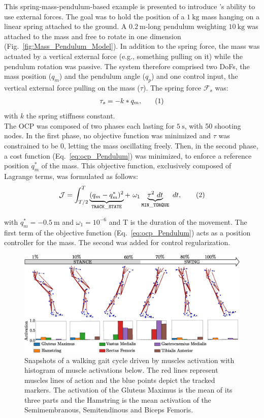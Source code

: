 This spring-mass-pendulum-based example is presented to introduce \bioptim 's ability to use external forces.
The goal was to hold the position of a $\SI{1}{\kilo\gram}$ mass hanging on a linear spring attached to the ground.
A $\SI{0.2}{\meter}$-long pendulum weighting $\SI{10}{\kilo\gram}$ was attached to the mass and free to rotate in one dimension (Fig.~\ref{fig:Mass_Pendulum_Model}).
In addition to the spring force, the mass was actuated by a vertical external force (e.g., something pulling on it) while the pendulum rotation was passive.
The system therefore comprised two DoFs, the mass position ($q_m$) and the pendulum angle ($q_p$) and one control input, the vertical external force pulling on the mass ($\tau$). 
The spring force $\mathcal{F}_s$ was:
\[
\begin{aligned}
\tau_s = -k*q_m,
\end{aligned}
\addtag
\label{eq:f_ext}
\]
with $k$ the spring stiffness constant.\\
The OCP was composed of two phases each lasting for $\SI{5}{\second}$, with 50 shooting nodes.
In the first phase, no objective function was minimized and $\tau$ was constrained to be $0$, letting the mass oscillating freely. 
Then, in the second phase, a cost function (Eq.~\ref{eq:ocp_Pendulum}) was minimized, to enforce a reference position $q_m^*$ of the mass.
This objective function, exclusively composed of Lagrange terms, was formulated as follows:
\[
\mathcal{J} = \int_{T/2}^T \underbrace{ (q_m - q_m^*)^2}_{\mathtt{TRACK\_STATE}}  +~\omega_1 \underbrace{\tau^2~dt}_{\mathtt{MIN\_ TORQUE}}~dt,
\addtag
\label{eq:ocp_Pendulum}
\]

\noindent with $q_m^* = \SI{-0.5}{\meter}$ and $\omega_1 = 10^{-6}$ and T is the duration of the movement.
The first term of the objective function (Eq.~\ref{eq:ocp_Pendulum}) acts as a position controller for the mass.
The second was added for control regularization.

\begin{figure}[t!]
\centering
\includegraphics[width=\textwidth]{figures/multiphase_walking_cycle.eps}
\caption{Snapshots of a walking gait cycle driven by muscles activation with histogram of muscle activations below. The red lines represent muscles lines of action and the blue points depict the tracked markers. The activation of the Gluteus Maximus is the mean of its three parts and the Hamstring is the mean activation of the Semimembranous, Semitendinous and Biceps Femoris.}
\label{fig:snapshots_multiphase_walking_cycle}
\vspace*{-0.5cm}
\end{figure}

